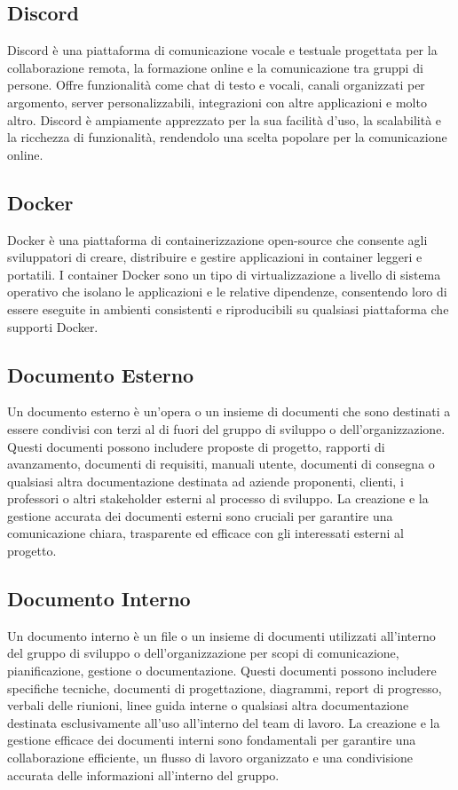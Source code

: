 \subsection*{Discord} 
Discord è una piattaforma di comunicazione vocale e testuale progettata per la collaborazione remota, la formazione online e la comunicazione tra gruppi di persone. Offre funzionalità come chat di testo e vocali, canali organizzati per argomento, server personalizzabili, integrazioni con altre applicazioni e molto altro. Discord è ampiamente apprezzato per la sua facilità d'uso, la scalabilità e la ricchezza di funzionalità, rendendolo una scelta popolare per la comunicazione online.
\subsection*{Docker} 
Docker è una piattaforma di containerizzazione open-source che consente agli sviluppatori di creare, distribuire e gestire applicazioni in container leggeri e portatili. I container Docker sono un tipo di virtualizzazione a livello di sistema operativo che isolano le applicazioni e le relative dipendenze, consentendo loro di essere eseguite in ambienti consistenti e riproducibili su qualsiasi piattaforma che supporti Docker.
\subsection*{Documento Esterno} 
Un documento esterno è un'opera o un insieme di documenti che sono destinati a essere condivisi con terzi al di fuori del gruppo di sviluppo o dell'organizzazione. Questi documenti possono includere proposte di progetto, rapporti di avanzamento, documenti di requisiti, manuali utente, documenti di consegna o qualsiasi altra documentazione destinata ad aziende proponenti, clienti, i professori o altri stakeholder esterni al processo di sviluppo. La creazione e la gestione accurata dei documenti esterni sono cruciali per garantire una comunicazione chiara, trasparente ed efficace con gli interessati esterni al progetto.
\subsection*{Documento Interno} 
Un documento interno è un file o un insieme di documenti utilizzati all'interno del gruppo di sviluppo o dell'organizzazione per scopi di comunicazione, pianificazione, gestione o documentazione. Questi documenti possono includere specifiche tecniche, documenti di progettazione, diagrammi, report di progresso, verbali delle riunioni, linee guida interne o qualsiasi altra documentazione destinata esclusivamente all'uso all'interno del team di lavoro. La creazione e la gestione efficace dei documenti interni sono fondamentali per garantire una collaborazione efficiente, un flusso di lavoro organizzato e una condivisione accurata delle informazioni all'interno del gruppo.
